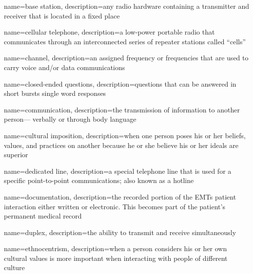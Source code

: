 \documentclass[../../EMT-169.tex]{subfiles}
\begin{document}
\setcounter{chapter}{3}
\label{ch:chapter4}
\clearpage
	
	
	{
		name=base station,
		description={any radio hardware containing a transmitter and receiver that is located in a fixed place}
	}
	
	{
		name=cellular telephone,
		description={a low-power portable radio that communicates through an interconnected series of repeater stations called “cells”}
	}
	
	{
		name=channel,
		description={an assigned frequency or frequencies that are used to carry voice and/or data communications}
	}
	
	{
		name=closed-ended questions,
		description={questions that can be answered in short bursts single word responses}
	}
	
	{
		name=communication,
		description={the transmission of information to another person— verbally or through body language}
	}
	
	{
		name=cultural imposition,
		description={when one person poses his or her beliefs, values, and practices on another because he or she believe his or her ideals are superior}
	}
	
	{
		name=dedicated line,
		description={a special telephone line that is used for a specific point-to-point communications; also known as a hotline}
	}
	
	{
		name=documentation,
		description={the recorded portion of the EMTs patient interaction either written or electronic.  This becomes part of the patient’s permanent medical record}
	}
	
	{
		name=duplex,
		description={the ability to transmit and receive simultaneously}
	}
	
	{
		name=ethnocentrism,
		description={when a person considers his or her own cultural values is more important when interacting with people of different culture}
	}
	
\end{document}
